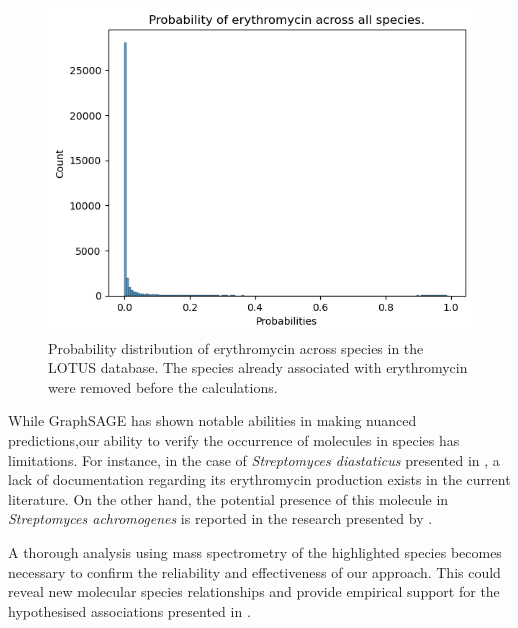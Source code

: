 \documentclass[
11pt, %
oneside, %
english, %
singlespacing, %
headsepline, %
chapterinoneline, %
]{MastersDoctoralThesis} %
\begin{document}
\begin{figure}[h]
	\centering
	\includegraphics[scale=0.7]{figure/erythromycin}
	\caption{Probability distribution of erythromycin across species in the LOTUS database. The species already associated with erythromycin were removed before the calculations.}
	\label{fig: hist erythromycin}
\end{figure}

While GraphSAGE has shown notable abilities in making nuanced predictions,our ability to verify the occurrence of molecules in species has limitations. For instance, in the case of \textit{Streptomyces diastaticus} presented in , a lack of documentation regarding its erythromycin production exists in the current literature. On the other hand, the potential presence of this molecule in \textit{Streptomyces achromogenes} is reported in the research presented by \cite{moosawiComputationalPredictionProperties2010}.

A thorough analysis using mass spectrometry of the highlighted species becomes necessary to confirm the reliability and effectiveness of our approach. This could reveal new molecular species relationships and provide empirical support for the hypothesised associations presented in .
\end{document}
